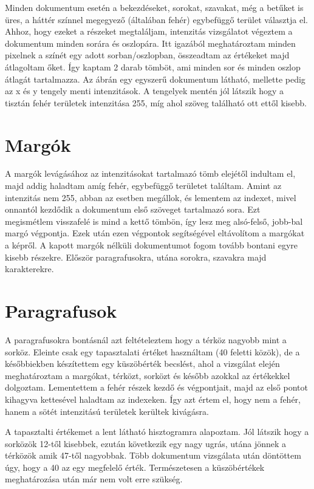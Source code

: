 \documentclass{article}
\begin{document}
Minden dokumentum esetén a bekezdéseket, sorokat, szavakat, még a betűket is üres, a háttér színnel megegyező (általában fehér) egybefüggő terület választja el. Ahhoz, hogy ezeket a részeket megtaláljam, intenzitás vizsgálatot végeztem a dokumentum minden sorára és oszlopára. Itt igazából meghatároztam minden pixelnek a színét egy adott sorban/oszlopban, összeadtam az értékeket majd átlagoltam őket. Így kaptam 2 darab tömböt, ami minden sor és minden osz\-lop átlagát tartalmazza. Az ábrán egy egyszerű dokumentum látható, mellette pedig az x és y tengely menti intenzitások. A tengelyek mentén jól látszik hogy a tisztán fehér területek intenzitása 255, míg ahol szöveg található ott ettől kisebb. 

\section{Margók}

A margók levágásához az intenzitásokat tartalmazó tömb elejétől indultam el, majd addig haladtam amíg fehér, egybefüggő területet találtam. Amint az intenzitás nem 255, abban az esetben megállok, és lementem az indexet, mivel onnantól kezdődik a dokumentum első szöveget tartalmazó sora. Ezt megismétlem visszafelé is mind a kettő tömbön, így lesz meg alsó-felső, jobb-bal margó végpontja. Ezek után ezen végpontok segítségével eltávolítom a margókat a képről. A kapott margók nélküli dokumentumot fogom tovább bontani egyre kisebb részekre. Először paragrafusokra, utána sorokra, szavakra majd karakterekre.

\section{Paragrafusok}

A paragrafusokra bontásnál azt feltételeztem hogy a térköz nagyobb mint a sorköz. Eleinte csak egy tapasztalati értéket használtam (40 feletti közök), de a későbbiekben készítettem egy küszöbérték becslést, ahol a vizsgálat elején meghatároztam a margókat, térközt, sorközt és később azokkal az értékekkel dolgoztam. Lementettem a fehér részek kezdő és végpontjait, majd az első pontot kihagyva kettesével haladtam az indexeken. Így azt értem el, hogy nem a fehér, hanem a sötét intenzitású területek kerültek kivágásra.

A tapasztalti értékemet a lent látható hisztogramra alapoztam. Jól látszik hogy a sorközök 12-től kisebbek, ezután következik egy nagy ugrás, utána jönnek a térközök amik 47-től nagyobbak. Több dokumentum vizsgálata után döntöttem úgy, hogy a 40 az egy megfelelő érték. Természetesen a küszöbértékek meghatározása után már nem volt erre szükség.
\end{document}
